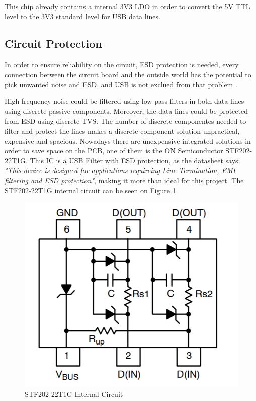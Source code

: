 		This chip already contains a internal 3V3 LDO in order to convert the 5V TTL level to the 3V3 standard level for USB data lines.


	\subsection{Circuit Protection}
		In order to ensure reliability on the circuit, ESD protection is needed, every connection between the circuit board and the outside world has the potential to pick unwanted noise and ESD, and USB is not exclued from that problem \cite{circuit-protection-usb}.

		High-frequency noise could be filtered using low pass filters in both data lines using discrete passive components. Moreover, the data lines could be protected from ESD using discrete TVS. The number of discrete componentes needed to filter and protect the lines makes a discrete-component-solution unpractical, expensive and spacious. Nowadays there are unexpensive integrated solutions in order to save space on the PCB, one of them is the ON Semiconductor STF202-22T1G. This IC is a USB Filter with ESD protection, as the datasheet \cite{stf202-22t1g-datasheet} says: \textit{"This device is designed for applications requireing Line Termination, EMI filtering and ESD protection"}, making it more than ideal for this project. The STF202-22T1G internal circuit can be seen on Figure \ref{fig:stf202-22t1g-sch}.

		\begin{figure}[htbp]
			\centering
				\includegraphics[scale=1]{figuras/fig-stf202-22t1g-sch}
			\caption{STF202-22T1G Internal Circuit \cite{stf202-22t1g-sch}}
			\label{fig:stf202-22t1g-sch}
		\end{figure}

